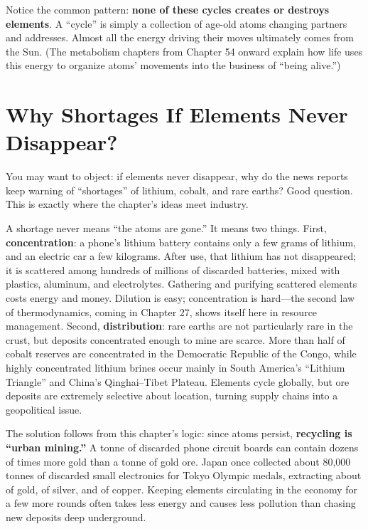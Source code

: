 Notice the common pattern: \textbf{none of these cycles creates or destroys elements}. A ``cycle'' is simply a collection of age-old atoms changing partners and addresses. Almost all the energy driving their moves ultimately comes from the Sun. (The metabolism chapters from Chapter 54 onward explain how life uses this energy to organize atoms' movements into the business of ``being alive.'')

\section{Why Shortages If Elements Never Disappear?}

You may want to object: if elements never disappear, why do the news reports keep warning of ``shortages'' of lithium, cobalt, and rare earths? Good question. This is exactly where the chapter's ideas meet industry.

A shortage never means ``the atoms are gone.'' It means two things. First, \textbf{concentration}: a phone's lithium battery contains only a few grams of lithium, and an electric car a few kilograms. After use, that lithium has not disappeared; it is scattered among hundreds of millions of discarded batteries, mixed with plastics, aluminum, and electrolytes. Gathering and purifying scattered elements costs energy and money. Dilution is easy; concentration is hard---the second law of thermodynamics, coming in Chapter 27, shows itself here in resource management. Second, \textbf{distribution}: rare earths are not particularly rare in the crust, but deposits concentrated enough to mine are scarce. More than half of cobalt reserves are concentrated in the Democratic Republic of the Congo, while highly concentrated lithium brines occur mainly in South America's ``Lithium Triangle'' and China's Qinghai--Tibet Plateau. Elements cycle globally, but ore deposits are extremely selective about location, turning supply chains into a geopolitical issue.

The solution follows from this chapter's logic: since atoms persist, \textbf{recycling is ``urban mining.''} A tonne of discarded phone circuit boards can contain dozens of times more gold than a tonne of gold ore. Japan once collected about 80,000 tonnes of discarded small electronics for Tokyo Olympic medals, extracting about  of gold,  of silver, and  of copper. Keeping elements circulating in the economy for a few more rounds often takes less energy and causes less pollution than chasing new deposits deep underground.

